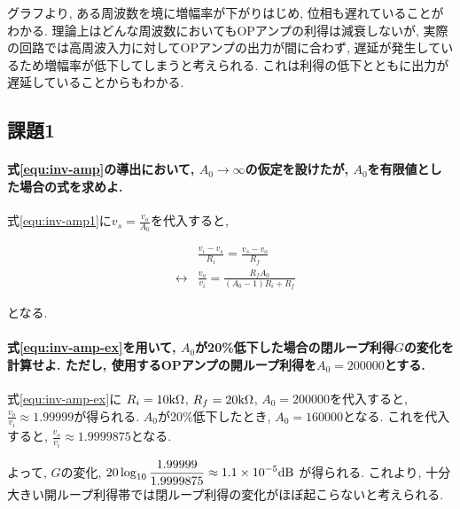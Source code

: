 \documentclass[titlepage]{jsarticle}
\begin{document}
        グラフより,
        ある周波数を境に増幅率が下がりはじめ,
        位相も遅れていることがわかる.
        理論上はどんな周波数においてもOPアンプの利得は減衰しないが,
        実際の回路では高周波入力に対してOPアンプの出力が間に合わず,
        遅延が発生しているため増幅率が低下してしまうと考えられる.
        これは利得の低下とともに出力が遅延していることからもわかる.

    \subsection{課題1}
        \paragraph{
            式\ref{equ:inv-amp}の導出において,
            $A_0 \rightarrow \infty$の仮定を設けたが,
            $A_0$を有限値とした場合の式を求めよ. \\
        }
            式\ref{equ:inv-amp1}に$\displaystyle v_s = \frac{v_o}{A_0}$を代入すると,

            \begin{eqnarray}
                && \frac{v_i - v_s}{R_i} = \frac{v_s - v_o}{R_f} \nonumber \\
                &\leftrightarrow& \frac{v_o}{v_i} = \frac{R_f A_0}{(A_0 - 1)R_i + R_f} \label{equ:inv-amp-ex}
            \end{eqnarray}

            となる.

        \paragraph{
            式\ref{equ:inv-amp-ex}を用いて,
            $A_0$が20\%低下した場合の閉ループ利得$G$の変化を計算せよ.
            ただし, 使用するOPアンプの開ループ利得を$A_0 = 200000$とする. \\
        }
            式\ref{equ:inv-amp-ex}に
            $R_i = 10 \rm{k\Omega}$, $R_f = 20\rm{k\Omega}$,
            $A_0 = 200000$を代入すると,
            $\displaystyle\frac{v_o}{v_i} \approx 1.99999$が得られる.
            $A_0$が20\%低下したとき, $A_0 = 160000$となる.
            これを代入すると,
            $\displaystyle\frac{v_o}{v_i} \approx 1.9999875$となる.

            よって, $G$の変化,
            $\displaystyle20\log_{10}\frac{1.99999}{1.9999875} \approx 1.1 \times 10^{-5} \rm{dB}$
            が得られる.
            これより, 十分大きい開ループ利得帯では閉ループ利得の変化がほぼ起こらないと考えられる.
\end{document}
